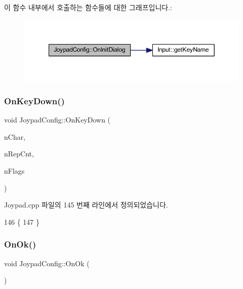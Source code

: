 이 함수 내부에서 호출하는 함수들에 대한 그래프입니다.\+:
\nopagebreak
\begin{figure}[H]
\begin{center}
\leavevmode
\includegraphics[width=349pt]{class_joypad_config_afc8d09942cc5d7ff9e69e27a98ff2430_cgraph}
\end{center}
\end{figure}
\mbox{\label{class_joypad_config_a17d863f586b81ee50fa579ec637d834c}} 
\subsubsection{\texorpdfstring{On\+Key\+Down()}{OnKeyDown()}}
{\footnotesize\ttfamily void Joypad\+Config\+::\+On\+Key\+Down (\begin{DoxyParamCaption}\item[{U\+I\+NT}]{n\+Char,  }\item[{U\+I\+NT}]{n\+Rep\+Cnt,  }\item[{U\+I\+NT}]{n\+Flags }\end{DoxyParamCaption})\hspace{0.3cm}{\ttfamily [protected]}}



Joypad.\+cpp 파일의 145 번째 라인에서 정의되었습니다.


\begin{DoxyCode}
146 \{
147 \}
\end{DoxyCode}
\mbox{\label{class_joypad_config_a80b628b0368a606e47d6ecd2d1e76624}} 
\subsubsection{\texorpdfstring{On\+Ok()}{OnOk()}}
{\footnotesize\ttfamily void Joypad\+Config\+::\+On\+Ok (\begin{DoxyParamCaption}{ }\end{DoxyParamCaption})\hspace{0.3cm}{\ttfamily [protected]}}



